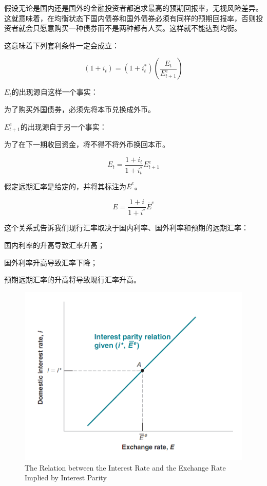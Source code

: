 \documentclass{article}
\begin{document}
假设无论是国内还是国外的金融投资者都追求最高的预期回报率，无视风险差异。这就意味着，在均衡状态下国内债券和国外债券必须有同样的预期回报率，否则投资者就会只愿意购买一种债券而不是两种都有人买。这样就不能达到均衡。

这意味着下列套利条件一定会成立：

\[
(1+i_t)=(1+i^*_t)(\frac{E_t}{E^e_{t+1}})
\]

$ E_t $的出现源自这样一个事实：

为了购买外国债券，必须先将本币兑换成外币。

$ E^e_{t+1} $的出现源自于另一个事实：

为了在下一期收回资金，将不得不将外币换回本币。

\[
E_t=\frac{1+i_t}{1+i_t^*}E^e_{t+1}
\]

假定远期汇率是给定的，并将其标注为$ \overline{E}^e $。

\[
E=\frac{1+i}{1+i^*}\overline{E}^e
\]

这个关系式告诉我们现行汇率取决于国内利率、国外利率和预期的远期汇率：

国内利率的升高导致汇率升高；

国外利率升高导致汇率下降；

预期远期汇率的升高将导致现行汇率升高。

\begin{figure}[H] %
	\centering %
	\includegraphics[width=1\textwidth]{19_1} %
	\caption{The Relation between
		the Interest Rate and the
		Exchange Rate Implied by
		Interest Parity} %
	\label{Fig.main2} %
\end{figure}
\end{document}
